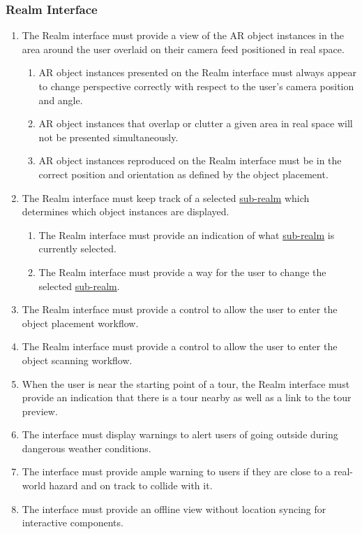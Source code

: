 \documentclass{article}
\begin{document}
\subsubsection{Realm Interface}
\label{ssub:realm_interface}

\begin{enumerate}[align=left, label=\textbf{RI-FR\arabic*:}]
    \item The Realm interface must provide a view of the AR object instances in the area around the user overlaid on their camera feed positioned in real space.
          \begin{enumerate}[align=left, label=\textbf{RI-FR1.\arabic*:}]
              \item AR object instances presented on the Realm interface must always appear to change perspective correctly with respect to the user’s camera position and angle.
              \item AR object instances that overlap or clutter a given area in real space will not be presented simultaneously.
              \item AR object instances reproduced on the Realm interface must be in the correct position and orientation as defined by the object placement.
          \end{enumerate}

    \item The Realm interface must keep track of a selected \hyperref[def:sub_realm]{sub-realm} which determines which object instances are displayed.
          \begin{enumerate}[align=left, label=\textbf{RI-FR2.\arabic*:}]
              \item The Realm interface must provide an indication of what \hyperref[def:sub_realm]{sub-realm} is currently selected.
              \item The Realm interface must provide a way for the user to change the selected \hyperref[def:sub_realm]{sub-realm}.
          \end{enumerate}

    \item The Realm interface must provide a control to allow the user to enter the object placement workflow.
    \item The Realm interface must provide a control to allow the user to enter the object scanning workflow.
    \item When the user is near the starting point of a tour, the Realm interface must provide an indication that there is a tour nearby as well as a link to the tour preview.
    \item The interface must display warnings to alert users of going outside during dangerous weather conditions. \\
    \item The interface must provide ample warning to users if they are close to a real-world hazard and on track to collide with it. \\
    \item The interface must provide an offline view without location syncing for interactive components. \\
\end{enumerate}
\end{document}
